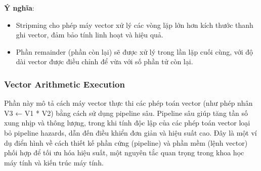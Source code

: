 \documentclass[a4paper]{article}
\begin{document}
\textbf{Ý nghĩa}:
\begin{itemize}
    \item Stripming cho phép máy vector xử lý các vòng lặp lớn hơn kích thước thanh ghi vector, đảm bảo tính linh hoạt và hiệu quả.
    \item  Phần remainder (phần còn lại) sẽ được xử lý trong lần lặp cuối cùng, với độ dài vector được điều chỉnh để vừa với số phần tử còn lại.
\end{itemize}

\subsubsection{Vector Arithmetic Execution}
Phần này mô tả cách máy vector thực thi các phép toán vector (như phép nhân V3 ← V1 * V2) bằng cách sử dụng pipeline sâu. Pipeline sâu giúp tăng tần số xung nhịp và thông lượng, trong khi tính độc lập của các phép toán vector loại bỏ pipeline hazards, dẫn đến điều khiển đơn giản và hiệu suất cao. Đây là một ví dụ điển hình về cách thiết kế phần cứng (pipeline) và phần mềm (lệnh vector) phối hợp để tối ưu hóa hiệu suất, một nguyên tắc quan trọng trong khoa học máy tính và kiến trúc máy tính.
\end{document}
